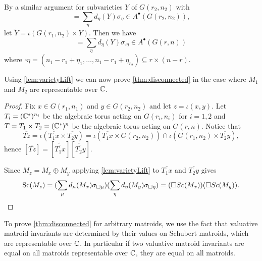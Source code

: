By a similar argument for subvarieties $Y$ of $G(r_2,n_2)$ with 
\begin{equation*}
    [Y] = \sum_\eta d_\eta(Y) \sigma_\eta \in A^\bullet(G(r_2,n_2)),
\end{equation*}
let $\tilde{Y} = \iota(G(r_1,n_2) \times Y)$. Then we have
\begin{equation*}
    [\tilde{Y}] = \sum_\eta d_\eta(Y) \sigma_{\square \eta} \in A^\bullet (G(r,n))
\end{equation*}
where $\square \eta = (n_1-r_1+\eta_1, \dots, n_1-r_1 + \eta_{r_2}) \subseteq r \times (n-r)$.

Using \cref{lem:varietyLift} we can now prove \cref{thm:disconnected} in the case where $M_1$ and $M_2$ are representable over ${\mathbb C}$.
\begin{proof}
    Fix $x \in G(r_1,n_1)$ and $y \in G(r_2,n_2)$ and let $z = \iota(x,y)$. Let $T_i = ({\mathbb C}^*)^{n_i}$ be the algebraic torus acting on $G(r_i,n_i)$  for $i = 1,2$ and $T = T_1 \times T_2 = ({\mathbb C}^*)^n$ be the algebraic torus acting on $G(r,n)$. Notice that
    \begin{equation*}
        \overline{Tz} = \iota(\overline{T_1 x} \times \overline{T_2 y}) = \iota(\overline{T_1 x} \times G(r_2,n_2)) \cap \iota(G(r_1,n_2) \times \overline{T_2 y}),
    \end{equation*}
    hence $[\overline{Tz}] = [\tilde{\overline{T_1 x}}][\tilde{\overline{T_2 y}}]$.
    
    Since $M_z = M_x \oplus M_y$ applying \cref{lem:varietyLift} to $\overline{T_1 x}$ and $\overline{T_2 y}$ gives
    \begin{equation*}
        \operatorname{\mathrm{Sc}}(M_z) = (\sum_\mu d_\mu(M_x) \sigma_{\square \mu}) (\sum_\eta d_\eta(M_y) \sigma_{\square \eta}) = (\square Sc(M_x))(\square Sc(M_y)). \qedhere
    \end{equation*}
\end{proof}

To prove \cref{thm:disconnected} for arbitrary matroids, we use the fact that valuative matroid invariants are determined by their values on Schubert matroids, which are representable over ${\mathbb C}$. In particular if two valuative matroid invariants are equal on all matroids representable over ${\mathbb C}$, they are equal on all matroids.

